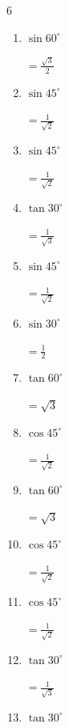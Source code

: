 \begin{multicols}{6}
\begin{enumerate}
\columnbreak %

  \item $\displaystyle \sin{60^\circ}$

        $\displaystyle =\frac{\sqrt{3}}{2}$

  \item $\displaystyle \sin{45^\circ}$

        $\displaystyle =\frac{1}{\sqrt{2}}$

  \item $\displaystyle \sin{45^\circ}$

        $\displaystyle =\frac{1}{\sqrt{2}}$

  \item $\displaystyle \tan{30^\circ}$

        $\displaystyle =\frac{1}{\sqrt{3}}$

  \item $\displaystyle \sin{45^\circ}$

        $\displaystyle =\frac{1}{\sqrt{2}}$

  \item $\displaystyle \sin{30^\circ}$

        $\displaystyle =\frac{1}{2}$

  \item $\displaystyle \tan{60^\circ}$

        $\displaystyle =\sqrt{3}$

  \item $\displaystyle \cos{45^\circ}$

        $\displaystyle =\frac{1}{\sqrt{2}}$

  \item $\displaystyle \tan{60^\circ}$

        $\displaystyle =\sqrt{3}$

  \item $\displaystyle \cos{45^\circ}$

        $\displaystyle =\frac{1}{\sqrt{2}}$

  \item $\displaystyle \cos{45^\circ}$

        $\displaystyle =\frac{1}{\sqrt{2}}$

  \item $\displaystyle \tan{30^\circ}$

        $\displaystyle =\frac{1}{\sqrt{3}}$

  \item $\displaystyle \tan{30^\circ}$


\end{enumerate}
\end{multicols}
